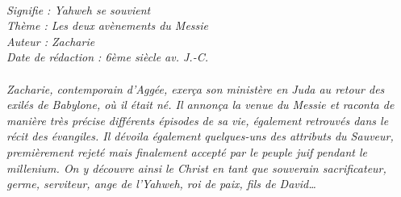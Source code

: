 \BFont
\noindent\hrulefill
{\footnotesize
\textit{
\bigskip
{\centering{}
\\Signifie : Yahweh se souvient
\\Thème : Les deux avènements du Messie
\\Auteur : Zacharie
\\Date de rédaction : 6ème siècle av. J.-C.\\}
}
\textit{
\\Zacharie, contemporain d’Aggée, exerça son ministère en Juda au retour des exilés de Babylone, où il était né. Il annonça la venue du Messie et raconta de manière très précise différents épisodes de sa vie, également retrouvés dans le récit des évangiles. Il dévoila également quelques-uns des attributs du Sauveur, premièrement rejeté mais finalement accepté par le peuple juif pendant le millenium. On y découvre ainsi le Christ en tant que souverain sacrificateur, germe, serviteur, ange de l’Yahweh, roi de paix, fils de David…\bigskip
}
}
\par\nobreak\noindent\hrulefill
